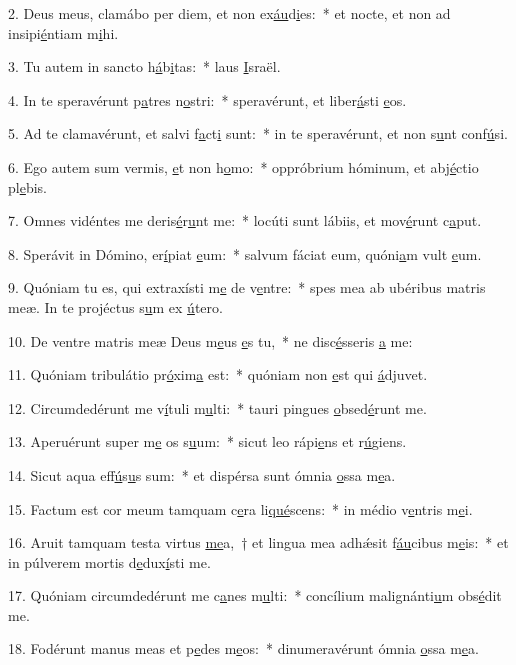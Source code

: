2. Deus meus, clamábo per diem, et non ex\uline{áu}d\uline{i}es:~* et nocte, et non ad insipi\uline{é}ntiam m\uline{i}hi.\par 
3. Tu autem in sancto h\uline{á}b\uline{i}tas:~* laus \uline{I}sraël.\par 
4. In te speravérunt p\uline{a}tres n\uline{o}stri:~* speravérunt, et liber\uline{á}sti \uline{e}os.\par 
5. Ad te clamavérunt, et salvi f\uline{a}ct\uline{i} sunt:~* in te speravérunt, et non s\uline{u}nt conf\uline{ú}si.\par 
6. Ego autem sum vermis, \uline{e}t non h\uline{o}mo:~* oppróbrium hóminum, et abj\uline{é}ctio pl\uline{e}bis.\par 
7. Omnes vidéntes me deris\uline{é}r\uline{u}nt me:~* locúti sunt lábiis, et mov\uline{é}runt c\uline{a}put.\par 
8. Sperávit in Dómino, er\uline{í}piat \uline{e}um:~* salvum fáciat eum, quóni\uline{a}m vult \uline{e}um.\par 
9. Quóniam tu es, qui extraxísti m\uline{e} de v\uline{e}ntre:~* spes mea ab ubéribus matris meæ. In te projéctus s\uline{u}m ex \uline{ú}tero.\par 
10. De ventre matris meæ Deus m\uline{e}us \uline{e}s tu,~* ne disc\uline{é}sseris \uline{a} me:\par 
11. Quóniam tribulátio pr\uline{ó}xim\uline{a} est:~* quóniam non \uline{e}st qui \uline{á}djuvet.\par 
12. Circumdedérunt me v\uline{í}tuli m\uline{u}lti:~* tauri pingues \uline{o}bsed\uline{é}runt me.\par 
13. Aperuérunt super m\uline{e} os s\uline{u}um:~* sicut leo rápi\uline{e}ns et r\uline{ú}giens.\par 
14. Sicut aqua eff\uline{ú}s\uline{u}s sum:~* et dispérsa sunt ómnia \uline{o}ssa m\uline{e}a.\par 
15. Factum est cor meum tamquam c\uline{e}ra li\uline{qué}scens:~* in médio v\uline{e}ntris m\uline{e}i.\par 
16. Aruit tamquam testa virtus \uline{me}a,~† et lingua mea adhǽsit f\uline{áu}cibus m\uline{e}is:~* et in púlverem mortis d\uline{e}dux\uline{í}sti me.\par 
17. Quóniam circumdedérunt me c\uline{a}nes m\uline{u}lti:~* concílium malignánti\uline{u}m obs\uline{é}dit me.\par 
18. Fodérunt manus meas et p\uline{e}des m\uline{e}os:~* dinumeravérunt ómnia \uline{o}ssa m\uline{e}a.\par 
